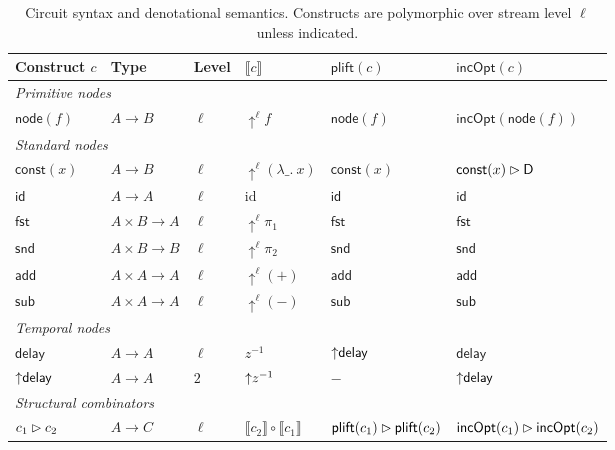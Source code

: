 \begin{table}[htb]
    \centering
    \caption{Circuit syntax and denotational semantics. Constructs are polymorphic over stream level $\ell$ unless indicated.}
    \label{tab:circuit-syntax}
    \footnotesize
    \begin{tabular}{llllll}
        \toprule
        \textbf{Construct $c$} & \textbf{Type} & \textbf{Level} & \textbf{$\llbracket c \rrbracket$} & \textbf{$\mathsf{plift}(c)$} & \textbf{$\mathsf{incOpt}(c)$} \\
        \midrule
        \multicolumn{6}{l}{\textit{Primitive nodes}} \\
        $\mathsf{node}(f)$ & $A \to B$ & $\ell$ & ${\uparrow}^{\ell} f$ & $\mathsf{node}(f)$ & $\mathsf{incOpt}(\mathsf{node}(f))$ \\
        \midrule
        \multicolumn{6}{l}{\textit{Standard nodes}} \\
        $\mathsf{const}(x)$ & $A \to B$ & $\ell$ & ${\uparrow}^{\ell} (\lambda\_.\ x)$ & $\mathsf{const}(x)$ & $\mathsf{const}(x) \mathbin{\vartriangleright} \mathsf{D}$ \\
        $\mathsf{id}$ & $A \to A$ & $\ell$ & $\mathrm{id}$ & $\mathsf{id}$ & $\mathsf{id}$ \\
        $\mathsf{fst}$ & $A \times B \to A$ & $\ell$ & ${\uparrow}^{\ell} \pi_1$ & $\mathsf{fst}$ & $\mathsf{fst}$ \\
        $\mathsf{snd}$ & $A \times B \to B$ & $\ell$ & ${\uparrow}^{\ell} \pi_2$ & $\mathsf{snd}$ & $\mathsf{snd}$ \\
        $\mathsf{add}$ & $A \times A \to A$ & $\ell$ & ${\uparrow}^{\ell} (+)$ & $\mathsf{add}$ & $\mathsf{add}$ \\
        $\mathsf{sub}$ & $A \times A \to A$ & $\ell$ & ${\uparrow}^{\ell} (-)$ & $\mathsf{sub}$ & $\mathsf{sub}$ \\
        \midrule
        \multicolumn{6}{l}{\textit{Temporal nodes}} \\
        $\mathsf{delay}$ & $A \to A$ & $\ell$ & $z^{-1}$ & $\mathsf{{\uparrow}delay}$ & $\mathsf{delay}$ \\
        $\mathsf{{\uparrow}delay}$ & $A \to A$ & $2$ & ${\uparrow}z^{-1}$ & $-$ & $\mathsf{{\uparrow}delay}$ \\
        \midrule
        \multicolumn{6}{l}{\textit{Structural combinators}} \\
        $c_1 \mathbin{\vartriangleright} c_2$ & $A \to C$ & $\ell$ & $\llbracket c_2 \rrbracket \circ \llbracket c_1 \rrbracket$ & $\mathsf{plift}(c_1) \mathbin{\vartriangleright} \mathsf{plift}(c_2)$ & $\mathsf{incOpt}(c_1) \mathbin{\vartriangleright} \mathsf{incOpt}(c_2)$ \\

\end{tabular}
\end{table}
